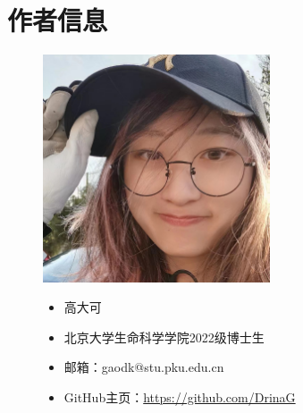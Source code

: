 \chapter*{作者信息}

\begin{figure}[ht]
    \hfill
    \begin{minipage}[c]{0.4\textwidth}
        \includegraphics[width=0.6\textwidth]{./image/author-gdk.jpg}
    \end{minipage}
    \hfil
    \begin{minipage}[c]{0.5\textwidth}
        \begin{itemize}
            \item 高大可
            \item 北京大学生命科学学院2022级博士生
            \item 邮箱：gaodk@stu.pku.edu.cn
            \item GitHub主页：\href{https://github.com/DrinaG}{https://github.com/DrinaG}
        \end{itemize}
    \end{minipage}
    \vspace{0.5cm}


\end{figure}

